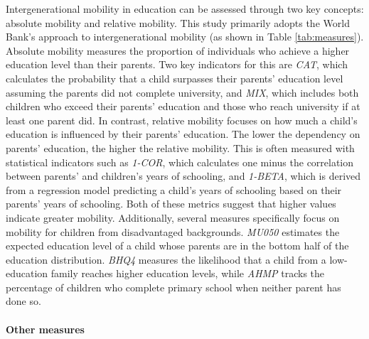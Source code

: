 Intergenerational mobility in education can be assessed through two key concepts: absolute mobility and relative mobility. This study primarily adopts the World Bank’s approach \citep{van2024intergenerational, narayan2018fair} to intergenerational mobility (as shown in Table \ref{tab:measures}). Absolute mobility measures the proportion of individuals who achieve a higher education level than their parents. Two key indicators for this are \textit{CAT}, which calculates the probability that a child surpasses their parents’ education level assuming the parents did not complete university, and \textit{MIX}, which includes both children who exceed their parents' education and those who reach university if at least one parent did. In contrast, relative mobility focuses on how much a child’s education is influenced by their parents’ education. The lower the dependency on parents' education, the higher the relative mobility. This is often measured with statistical indicators such as \textit{1-COR}, which calculates one minus the correlation between parents’ and children’s years of schooling, and \textit{1-BETA}, which is derived from a regression model predicting a child’s years of schooling based on their parents' years of schooling. Both of these metrics suggest that higher values indicate greater mobility. Additionally, several measures specifically focus on mobility for children from disadvantaged backgrounds. \textit{MU050} estimates the expected education level of a child whose parents are in the bottom half of the education distribution. \textit{BHQ4} measures the likelihood that a child from a low-education family reaches higher education levels, while \textit{AHMP} tracks the percentage of children who complete primary school when neither parent has done so.



\paragraph{Other measures}

